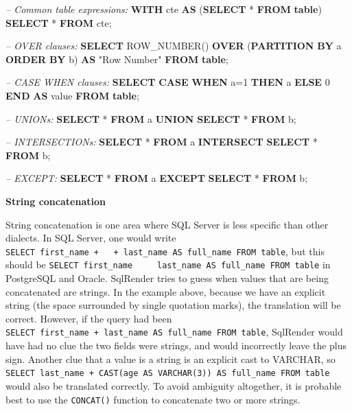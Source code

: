 \documentclass[11pt]{book}
\newenvironment{Shaded}{\begin{snugshade}}{\end{snugshade}}
\newcommand{\KeywordTok}[1]{\textcolor[rgb]{0.13,0.29,0.53}{\textbf{#1}}}
\newcommand{\DecValTok}[1]{\textcolor[rgb]{0.00,0.00,0.81}{#1}}
\newcommand{\CommentTok}[1]{\textcolor[rgb]{0.56,0.35,0.01}{\textit{#1}}}
\newcommand{\OtherTok}[1]{\textcolor[rgb]{0.56,0.35,0.01}{#1}}
\newcommand{\FunctionTok}[1]{\textcolor[rgb]{0.00,0.00,0.00}{#1}}
\newcommand{\NormalTok}[1]{#1}
\begin{document}
\begin{Shaded}
\begin{Highlighting}[]
\CommentTok{-- Common table expressions:}
\KeywordTok{WITH}\NormalTok{ cte }\KeywordTok{AS}\NormalTok{ (}\KeywordTok{SELECT}\NormalTok{ * }\KeywordTok{FROM} \KeywordTok{table}\NormalTok{) }\KeywordTok{SELECT}\NormalTok{ * }\KeywordTok{FROM}\NormalTok{ cte;}

\CommentTok{-- OVER clauses:}
\KeywordTok{SELECT} \FunctionTok{ROW_NUMBER}\NormalTok{() }\KeywordTok{OVER}\NormalTok{ (}\KeywordTok{PARTITION} \KeywordTok{BY}\NormalTok{ a }\KeywordTok{ORDER} \KeywordTok{BY}\NormalTok{ b)}
  \KeywordTok{AS} \OtherTok{"Row Number"} \KeywordTok{FROM} \KeywordTok{table}\NormalTok{;}
  
\CommentTok{-- CASE WHEN clauses:}
\KeywordTok{SELECT} \KeywordTok{CASE} \KeywordTok{WHEN}\NormalTok{ a=}\DecValTok{1} \KeywordTok{THEN}\NormalTok{ a }\KeywordTok{ELSE} \DecValTok{0} \KeywordTok{END} \KeywordTok{AS} \FunctionTok{value} \KeywordTok{FROM} \KeywordTok{table}\NormalTok{;}

\CommentTok{-- UNIONs:}
\KeywordTok{SELECT}\NormalTok{ * }\KeywordTok{FROM}\NormalTok{ a }\KeywordTok{UNION} \KeywordTok{SELECT}\NormalTok{ * }\KeywordTok{FROM}\NormalTok{ b;}

\CommentTok{-- INTERSECTIONs:}
\KeywordTok{SELECT}\NormalTok{ * }\KeywordTok{FROM}\NormalTok{ a }\KeywordTok{INTERSECT} \KeywordTok{SELECT}\NormalTok{ * }\KeywordTok{FROM}\NormalTok{ b;}

\CommentTok{-- EXCEPT:}
\KeywordTok{SELECT}\NormalTok{ * }\KeywordTok{FROM}\NormalTok{ a }\KeywordTok{EXCEPT} \KeywordTok{SELECT}\NormalTok{ * }\KeywordTok{FROM}\NormalTok{ b;}
\end{Highlighting}
\end{Shaded}

\textbf{String concatenation}

String concatenation is one area where SQL Server is less specific than
other dialects. In SQL Server, one would write
\texttt{SELECT\ first\_name\ +\ \textquotesingle{}\ \textquotesingle{}\ +\ last\_name\ AS\ full\_name\ FROM\ table},
but this should be
\texttt{SELECT\ first\_name\ \textbar{}\textbar{}\ \textquotesingle{}\ \textquotesingle{}\ \textbar{}\textbar{}\ last\_name\ AS\ full\_name\ FROM\ table}
in PostgreSQL and Oracle. SqlRender tries to guess when values that are
being concatenated are strings. In the example above, because we have an
explicit string (the space surrounded by single quotation marks), the
translation will be correct. However, if the query had been
\texttt{SELECT\ first\_name\ +\ last\_name\ AS\ full\_name\ FROM\ table},
SqlRender would have had no clue the two fields were strings, and would
incorrectly leave the plus sign. Another clue that a value is a string
is an explicit cast to VARCHAR, so
\texttt{SELECT\ last\_name\ +\ CAST(age\ AS\ VARCHAR(3))\ AS\ full\_name\ FROM\ table}
would also be translated correctly. To avoid ambiguity altogether, it is
probable best to use the \texttt{CONCAT()} function to concatenate two
or more strings.
\end{document}

